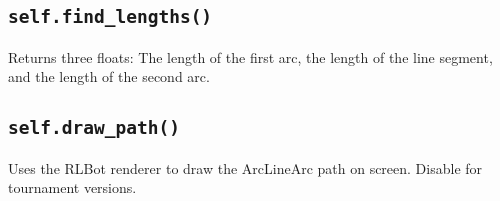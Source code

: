 \documentclass{article}
\newcommand{\method}[1]{\subsection{\texttt{self.#1}}}
\begin{document}
\begin{flushleft}
{        \method{find\_lengths()}
               {
                 Returns three floats: The length of the first arc, the length of the line segment, and the length of the second arc.
               }
        \method{draw\_path()}
               {
                 Uses the RLBot renderer to draw the ArcLineArc path on screen.  Disable for tournament versions.
               }
               



















      }
      
         









  
  





\end{flushleft}
\end{document}
